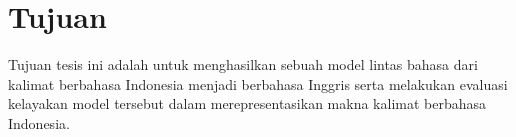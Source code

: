 \section{Tujuan}

Tujuan tesis ini adalah untuk menghasilkan sebuah model \amrparsing{} lintas bahasa dari kalimat berbahasa Indonesia menjadi \AMR{} berbahasa Inggris serta melakukan evaluasi kelayakan model tersebut dalam merepresentasikan makna kalimat berbahasa Indonesia.
